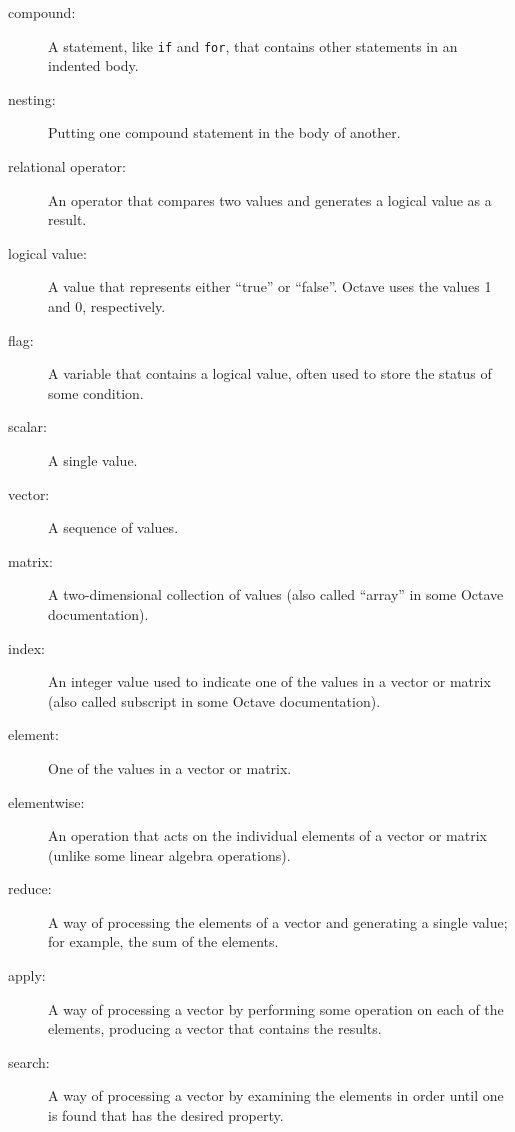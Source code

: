\begin{description}

\item[compound:] A statement, like {\tt if} and {\tt for}, that
contains other statements in an indented body.

\item[nesting:] Putting one compound statement in the body of another.

\item[relational operator:] An operator that compares two values and
generates a logical value as a result.

\item[logical value:] A value that represents either ``true'' or
``false''. Octave uses the values 1 and 0, respectively.

\item[flag:] A variable that contains a logical value, often used
to store the status of some condition.

\item[scalar:] A single value.

\item[vector:] A sequence of values.

\item[matrix:] A two-dimensional collection of values (also called
``array'' in some Octave documentation).

\item[index:] An integer value used to indicate one of the values
in a vector or matrix (also called subscript in some Octave documentation).

\item[element:] One of the values in a vector or matrix.

\item[elementwise:] An operation that acts on the individual elements
of a vector or matrix (unlike some linear algebra operations).

\item[reduce:] A way of processing the elements of a vector and
generating a single value; for example, the sum of the elements.

\item[apply:] A way of processing a vector by performing some operation
on each of the elements, producing a vector that contains the
results.

\item[search:] A way of processing a vector by examining the
elements in order until one is found that has the desired property.

\end{description}

